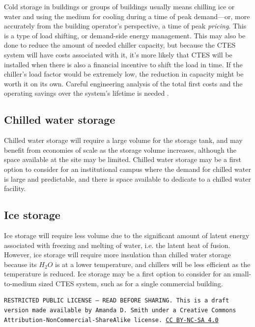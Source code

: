 \documentclass[10pt]{article}
\begin{document}
Cold storage in buildings or groups of buildings usually means chilling ice or water and using the medium for cooling during a time of peak demand---or, more accurately from the building operator's perspective, a time of peak \textit{pricing}. This is a type of load shifting, or demand-side energy management. This may also be done to reduce the amount of needed chiller capacity, but because the CTES system will have costs associated with it, it's more likely that CTES will be installed when there is also a financial incentive to shift the load in time. If the chiller's load factor would be extremely low, the reduction in capacity might be worth it on its own. Careful engineering analysis of the total first costs and the operating savings over the system's lifetime is needed \cite{McQuiston2005-oo}.
 
 \subsection{Chilled water storage}
 
 Chilled water storage will require a large volume for the storage tank, and may benefit from economies of scale as the storage volume increases, although the space available at the site may be limited. Chilled water storage may be a first option to consider for an institutional campus where the demand for chilled water is large and predictable, and there is space available to dedicate to a chilled water facility.
 
 \subsection{Ice storage}
 
 Ice storage will require less volume due to the significant amount of latent energy associated with freezing and melting of water, i.e. the latent heat of fusion. However, ice storage will require more insulation than chilled water storage because its $H_2O$ is at a lower temperature, and chillers will be less efficient as the temperature is reduced. Ice storage may be a first option to consider for an small-to-medium sized CTES system, such as for a single commercial building.


\bigskip

\noindent
\texttt{\footnotesize RESTRICTED PUBLIC LICENSE --- READ BEFORE SHARING. This is a draft version made available by Amanda D. Smith under a Creative Commons Attribution-NonCommercial-ShareAlike license. 
\href{https://creativecommons.org/licenses/by-nc-sa/4.0/}{CC BY-NC-SA 4.0}}


\printbibliography
\end{document}

